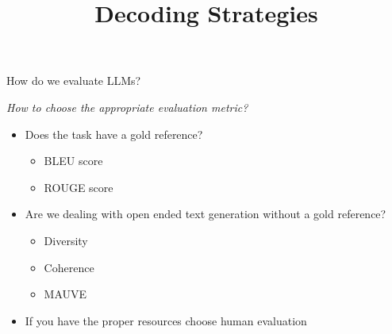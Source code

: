 



\newcommand{\learninggoals}{
\item Learn about evaluation metrics for open-ended text generation
\item Get to know the different metrics with- and without a gold reference
\item Get to know potential issues with some evaluation metrics
}
\def\myblue#1{\textcolor{texblue}{#1}}

\title{Decoding Strategies}
\date{}




\begin{vbframe}{How do we evaluate LLM\MakeLowercase{s}?}

\vfill

\textit{How to choose the appropriate evaluation metric?}

\hspace{}

\begin{itemize}
    \item Does the task have a gold reference?
    \begin{itemize}
        \item BLEU score 
        \item ROUGE score 
    \end{itemize}
    \item Are we dealing with open ended text generation without a gold reference?
    \begin{itemize}
        \item Diversity 
        \item Coherence 
        \item MAUVE 
    \end{itemize}
    \item If you have the proper resources choose human evaluation
\end{itemize}

\vfill
    
\end{vbframe}


